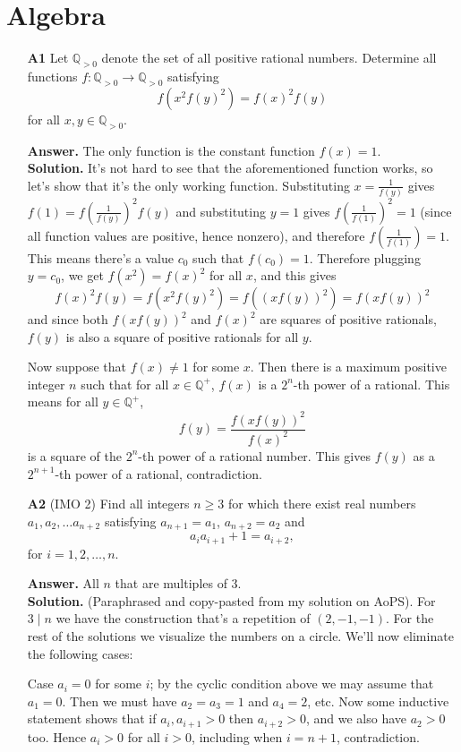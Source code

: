 \documentclass[11pt,a4paper]{article}
\begin{document}
\section*{Algebra}
\begin{enumerate}
	\item [\textbf{A1}] Let $\mathbb{Q}_{>0}$ denote the set of all positive rational numbers. Determine all functions $f:\mathbb{Q}_{>0}\to \mathbb{Q}_{>0}$ satisfying $$f(x^2f(y)^2)=f(x)^2f(y)$$for all $x,y\in\mathbb{Q}_{>0}$. 
	
	\textbf{Answer.} The only function is the constant function $f(x)=1$. \\
	\textbf{Solution.} It's not hard to see that the aforementioned function works, so let's show that it's the only working function. 
	Substituting $x=\frac{1}{f(y)}$ gives $f(1)=f(\frac{1}{f(y)})^2f(y)$ and substituting $y=1$ gives $f(\frac{1}{f(1)})^2=1$ (since all function values are positive, hence nonzero), and therefore $f(\frac{1}{f(1)})=1$. 
	This means there's a value $c_0$ such that $f(c_0)=1$. Therefore plugging $y=c_0$, we get $f(x^2)=f(x)^2$ for all $x$, and this gives 
	\[
	f(x)^2f(y)=f(x^2f(y)^2)=f((xf(y))^2)=f(xf(y))^2
	\]
	and since both $f(xf(y))^2$ and $f(x)^2$ are squares of positive rationals, $f(y)$ is also a square of positive rationals for all $y$. 
	
	Now suppose that $f(x)\neq 1$ for some $x$. Then there is a maximum positive integer $n$ such that for all $x\in\mathbb{Q}^+$, $f(x)$ is a $2^n$-th power of a rational. 
	This means for all $y\in\mathbb{Q}^+$, 
	\[
	f(y)=\frac{f(xf(y))^2}{f(x)^2}
	\]
	is a square of the $2^n$-th power of a rational number. This gives $f(y)$ as a $2^{n+1}$-th power of a rational, contradiction. 
	
	\item [\textbf{A2}] (IMO 2) Find all integers $n \geq 3$ for which there exist real numbers $a_1, a_2, \dots a_{n + 2}$ satisfying $a_{n + 1} = a_1$, $a_{n + 2} = a_2$ and
	$$a_ia_{i + 1} + 1 = a_{i + 2},$$for $i = 1, 2, \dots, n$.
	
	\textbf{Answer.} All $n$ that are multiples of 3. \\
	\textbf{Solution.} (Paraphrased and copy-pasted from my solution on AoPS). 
	For $3\mid n$ we have the construction that's a repetition of $(2, -1, -1)$. 
	For the rest of the solutions we visualize the numbers on a circle. 
	We'll now eliminate the following cases: 
	
	Case $a_i=0$ for some $i$; by the cyclic condition above we may assume that $a_1=0$. 
	Then we must have $a_2=a_3=1$ and $a_4=2$, etc. Now some inductive statement shows that if $a_i, a_{i+1}>0$ then $a_{i+2}>0$, and we also have $a_2>0$ too. Hence $a_i>0$ for all $i>0$, including when $i=n+1$, contradiction.
	

\end{enumerate}
\end{document}
